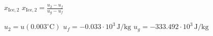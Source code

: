\( x_{\text{Ice},2} \)  
\( x_{\text{Ice},2} = \frac{u_2 - u_f}{u_g - u_f} \)  

\( u_2 = u(0.003^\circ \text{C}) \)  
\( u_f = -0.033 \cdot 10^3 \, \text{J/kg} \)  
\( u_g = -333.492 \cdot 10^3 \, \text{J/kg} \)